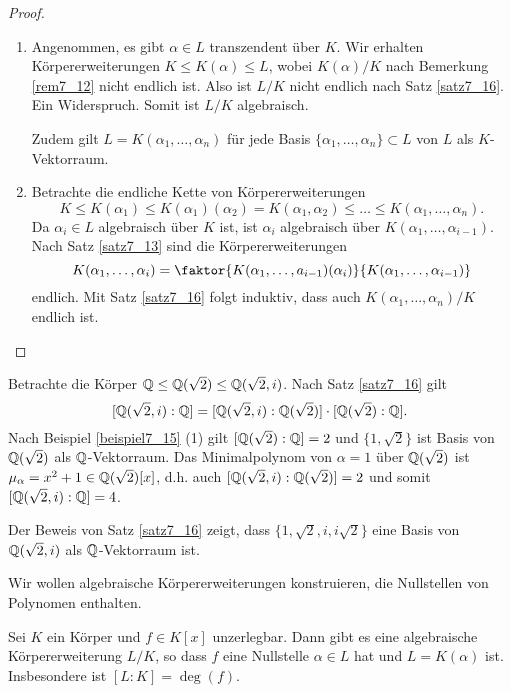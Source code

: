 \begin{proof}
	\begin{enumerate}[label=(\alph*)]
		\item Angenommen, es gibt $\alpha \in L$ transzendent über $K$. Wir erhalten Körpererweiterungen $K \leq K(\alpha) \leq L$, wobei $K(\alpha)/K$ nach Bemerkung \ref{rem7_12} nicht endlich ist. Also ist $L/K$ nicht endlich nach Satz \ref{satz7_16}. Ein Widerspruch. Somit ist $L/K$ algebraisch.
		
		Zudem gilt $L = K(\alpha_1, \dots, \alpha_n)$ für jede Basis $\{\alpha_1, \dots, \alpha_n\} \subset L$ von $L$ als $K$-Vektorraum.
		
		\item Betrachte die endliche Kette von Körpererweiterungen
		\[K \leq K(\alpha_1) \leq K(\alpha_1)(\alpha_2) = K(\alpha_1, \alpha_2) \leq \dots \leq K(\alpha_1, \dots, \alpha_n).\]
		Da $\alpha_i \in L$ algebraisch über $K$ ist, ist $\alpha_i$ algebraisch über $K(\alpha_1, \dots, \alpha_{i-1})$. Nach Satz \ref{satz7_13} sind die Körpererweiterungen 
		\[K(\alpha_1, \dots, \alpha_i) = \faktor{K(\alpha_1, \dots, a_{i-1})(\alpha_i)}{K(\alpha_1, \dots, \alpha_{i-1})} \]
		endlich. Mit Satz \ref{satz7_16} folgt induktiv, dass auch $K(\alpha_1, \dots, \alpha_n)/K$ endlich ist.
	\end{enumerate}
\end{proof}
\begin{beispiel}\label{beispiel7_18}
	Betrachte die Körper $\mathbb{Q} \leq \mathbb{Q}(\sqrt{2}) \leq \mathbb{Q}(\sqrt{2}, i)$. Nach Satz \ref{satz7_16} gilt
	\[[\mathbb{Q}(\sqrt{2},i) : \mathbb{Q}] = [\mathbb{Q}(\sqrt{2}, i) : \mathbb{Q}(\sqrt{2})] \cdot [\mathbb{Q}(\sqrt{2}) : \mathbb{Q}].\]
	Nach Beispiel \ref{beispiel7_15} (1) gilt $[\mathbb{Q}(\sqrt{2}) : \mathbb{Q}] = 2$ und $\{1, \sqrt{2}\}$ ist Basis von $\mathbb{Q}(\sqrt{2})$ als $\mathbb{Q}$-Vektorraum.
	Das Minimalpolynom von $\alpha = 1$ über $\mathbb{Q}(\sqrt{2})$ ist $\mu_\alpha = x^2 + 1 \in \mathbb{Q}(\sqrt{2})[x]$, d.h. auch $[\mathbb{Q}(\sqrt{2}, i) : \mathbb{Q}(\sqrt{2})] = 2$ und somit $[\mathbb{Q}(\sqrt{2}, i) : \mathbb{Q}] = 4$.
	
	Der Beweis von Satz \ref{satz7_16} zeigt, dass $\{1, \sqrt{2}, i, i \sqrt{2}\}$ eine Basis von $\mathbb{Q}(\sqrt{2}, i)$ als $\mathbb{Q}$-Vektorraum ist.
\end{beispiel}
\begin{leftbar}
	Wir wollen algebraische Körpererweiterungen konstruieren, die Nullstellen von Polynomen enthalten.
\end{leftbar}
\begin{satz}\label{satz7_19}
	Sei $K$ ein Körper und $f \in K[x]$ unzerlegbar. Dann gibt es eine algebraische Körpererweiterung $L/K$, so dass $f$ eine Nullstelle $\alpha \in L$ hat und $L = K(\alpha)$ ist. Insbesondere ist $[L:K] = \deg(f)$.
\end{satz}
